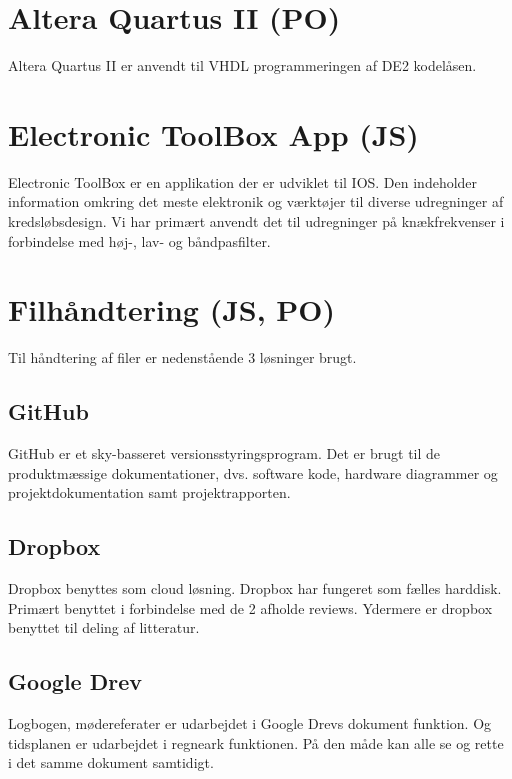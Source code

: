 \section{Altera Quartus II (PO)}
Altera Quartus II er anvendt til VHDL programmeringen af DE2 kodelåsen.

\section{Electronic ToolBox App (JS)}
Electronic ToolBox er en applikation der er udviklet til IOS. Den indeholder information omkring det meste elektronik og værktøjer til diverse udregninger af kredsløbsdesign. Vi har primært anvendt det til udregninger på knækfrekvenser i forbindelse med høj-, lav- og båndpasfilter.  

\section{Filhåndtering (JS, PO)}
Til håndtering af filer er nedenstående 3 løsninger brugt. 

\subsection{GitHub}
GitHub er et sky-basseret versionsstyringsprogram. Det er brugt til de produktmæssige dokumentationer, dvs. software kode, hardware diagrammer og projektdokumentation samt projektrapporten.

\subsection{Dropbox}
Dropbox benyttes som cloud løsning. Dropbox har fungeret som fælles harddisk. Primært benyttet i forbindelse med de 2 afholde reviews. Ydermere er dropbox benyttet til deling af litteratur. 

\subsection{Google Drev}
Logbogen, mødereferater er udarbejdet i Google Drevs dokument funktion. Og tidsplanen er udarbejdet i regneark funktionen. På den måde kan alle se og rette i det samme dokument samtidigt. 


